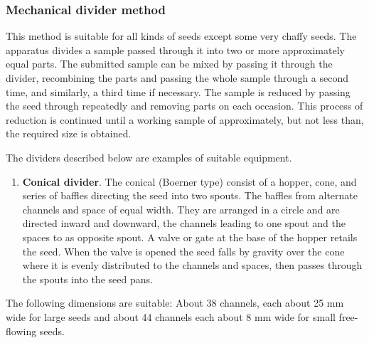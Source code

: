 \documentclass[
]{book}
\providecommand{\tightlist}{%
  \setlength{\itemsep}{0pt}\setlength{\parskip}{0pt}}
\begin{document}
\hypertarget{mechanical-divider-method}{%
\subsubsection{Mechanical divider method}\label{mechanical-divider-method}}

This method is suitable for all kinds of seeds except some very chaffy seeds. The apparatus divides a sample passed through it into two or more approximately equal parts. The submitted sample can be mixed by passing it through the divider, recombining the parts and passing the whole sample through a second time, and similarly, a third time if necessary. The sample is reduced by passing the seed through repeatedly and removing parts on each occasion. This process of reduction is continued until a working sample of approximately, but not less than, the required size is obtained.

The dividers described below are examples of suitable equipment.

\begin{enumerate}
\def\labelenumi{\alph{enumi}.}
\tightlist
\item
  \textbf{Conical divider}. The conical (Boerner type) consist of a hopper, cone, and series of baffles directing the seed into two spouts. The baffles from alternate channels and space of equal width. They are arranged in a circle and are directed inward and downward, the channels leading to one spout and the spaces to as opposite spout. A valve or gate at the base of the hopper retails the seed. When the valve is opened the seed falls by gravity over the cone where it is evenly distributed to the channels and spaces, then passes through the spouts into the seed pans.
\end{enumerate}

The following dimensions are suitable: About 38 channels, each about 25 mm wide for large seeds and about 44 channels each about 8 mm wide for small free- flowing seeds.
\end{document}
